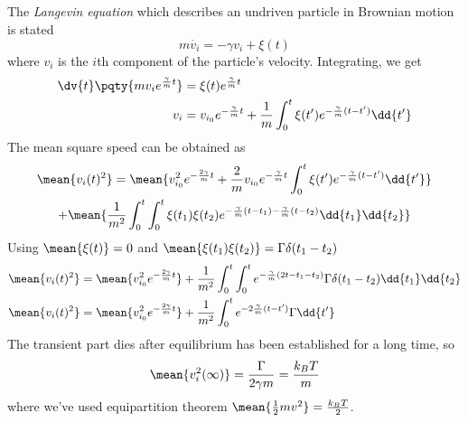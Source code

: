 \documentclass[12pt]{article}
\begin{document}
     \subsection{} The \emph{Langevin equation} which describes an undriven particle in Brownian motion is stated \[
        m \dot{v_i} = - \gamma v_i + \xi(t)
    \]
    where \(v_i\) is the \(i\)th component of the particle's velocity. Integrating, we get \begin{align*}
        \dv{t} \pqty{mv_i e^{ \frac{\gamma}{m}t}} &= \xi(t)e^{\frac{\gamma}{m} t}\\
        v_i &= v_{i_0}e^{ - \frac{\gamma}{m} t} + \frac{1}{m} \int_0^t \xi(t')e^{ -\frac{\gamma}{m} (t -t')} \dd{t'}
    \end{align*}
    The mean square speed can be obtained as \begin{multline*}
        \mean{v_i(t)^2} = \mean{v^2_{i_0}e^{ - \frac{2\gamma}{m} t} + \frac{2}{m} v_{i_0}e^{ - \frac{\gamma}{m} t}\int_0^t \xi(t')e^{ -\frac{\gamma}{m} (t -t')} \dd{t'} } \\
        +\mean{ \frac{1}{m^2}\int_0^t \int_0^t \xi(t_1)\xi(t_2)e^{ -\frac{\gamma}{m} (t - t_1) -\frac{\gamma}{m} (t - t_2)} \dd{t_1} \dd{t_2}}
    \end{multline*}
    Using \(\mean{\xi(t)} = 0\) and \(\mean{\xi(t_1)\xi(t_2)} = \Gamma  \delta({t_1 - t_2})\)
    \begin{align*}
        \mean{v_i(t)^2} &= \mean{v^2_{i_0}e^{ - \frac{2\gamma}{m} t} } + { \frac{1}{m^2}\int_0^t \int_0^t e^{ -\frac{\gamma}{m} (2t - t_1 - t_2)} \Gamma  \delta({t_1 - t_2}) \dd{t_1} \dd{t_2}}\\
        \mean{v_i(t)^2} &= \mean{v^2_{i_0}e^{ - \frac{2\gamma}{m} t} } + { \frac{1}{m^2}\int_0^t e^{ - 2\frac{\gamma}{m} (t - t')} \Gamma  \dd{t'}}
    \end{align*}
    The transient part dies after equilibrium has been established for a long time, so \[
        \mean{v_i^2(\infty)} =  \frac{\Gamma}{ 2\gamma m} = \frac{k_BT}{m} 
    \]
    where we've used equipartition theorem \(\mean{\frac{1}{2} m v^2} = \frac{k_BT}{2}\).
\end{document}
